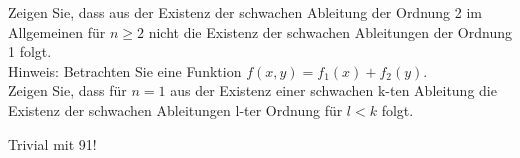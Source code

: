 \begin{exercise}

Zeigen Sie, dass aus der Existenz der schwachen Ableitung der Ordnung 2 im Allgemeinen für $n \geq 2$ nicht die Existenz der schwachen Ableitungen der Ordnung 1 folgt. \\

Hinweis: Betrachten Sie eine Funktion $f(x,y) = f_1(x) + f_2(y)$. \\

Zeigen Sie, dass für $n = 1$ aus der Existenz einer schwachen k-ten Ableitung die Existenz der schwachen Ableitungen l-ter Ordnung für $l < k$ folgt.

\end{exercise}

\begin{solution}

Trivial mit 91!

\end{solution}

